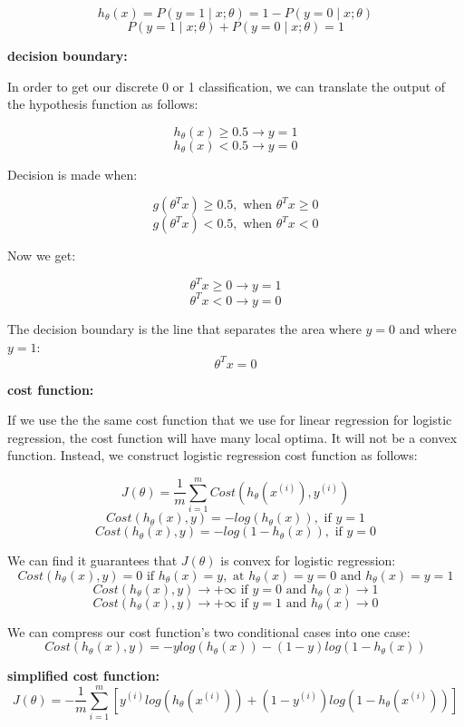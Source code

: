 \documentclass{article}
\begin{document}
\[
h_{\theta} (x) 
= P(y = 1 \mid x ; \theta)
= 1 - P(y = 0 \mid x ; \theta)
\]
\[P(y = 1 \mid x ; \theta) + P(y = 0 \mid x ; \theta) = 1\]

\noindent \textbf{decision boundary:}

\noindent In order to get our discrete 0 or 1 classification, we can translate the output of the hypothesis function as follows:

\[h_{\theta} (x) \geq 0.5 \rightarrow y = 1\]
\[h_{\theta} (x) < 0.5 \rightarrow y = 0\]

\noindent Decision is made when:

\[g(\theta^T x) \geq 0.5, \text{ when } \theta^T x \geq 0\]
\[g(\theta^T x) < 0.5, \text{ when } \theta^T x < 0\]

\noindent Now we get:

\[\theta^T x \geq 0 \rightarrow y = 1\]
\[\theta^T x < 0 \rightarrow y = 0\]

\noindent The decision boundary is the line that separates the area where \(y = 0\) and where \(y = 1\):
\[\theta^T x = 0\]

\noindent \textbf{cost function:}

\noindent If we use the the same cost function that we use for linear regression for logistic regression, the cost function will have many local optima. It will not be a convex function. Instead, we construct logistic regression cost function as follows:

\[J(\theta) = \frac{1}{m} \sum_{i = 1}^m Cost(h_{\theta}(x^{(i)}), y^{(i)})\]
\[Cost(h_{\theta}(x), y) = -log(h_{\theta}(x)), \text{ if } y = 1\]
\[Cost(h_{\theta}(x), y) = -log(1 - h_{\theta}(x)), \text{ if } y = 0\]

\noindent We can find it guarantees that \(J(\theta)\) is convex for logistic regression:
\[
Cost(h_{\theta}(x), y) = 0 \text{ if }
h_{\theta}(x) = y, \text{ at } h_{\theta}(x) = y = 0 \text{ and } 
h_{\theta}(x) = y = 1
\]
\[
Cost(h_{\theta}(x), y) \rightarrow +\infty
\text{ if } y = 0 \text{ and }
h_{\theta}(x) \rightarrow 1
\]
\[
Cost(h_{\theta}(x), y) \rightarrow +\infty
\text{ if } y = 1 \text{ and }
h_{\theta}(x) \rightarrow 0
\]

\noindent We can compress our cost function's two conditional cases into one case:
\[Cost(h_{\theta} (x), y) 
= - y log(h_{\theta} (x)) - (1 - y) log(1 - h_{\theta} (x))\]

\noindent \textbf{simplified cost function:}
\[J(\theta) = - \frac{1}{m} \sum_{i = 1}^{m} [y^{(i)} log(h_{\theta} (x^{(i)})) + (1 - y^{(i)}) log(1 - h_{\theta} (x^{(i)}))]\]
\end{document}
